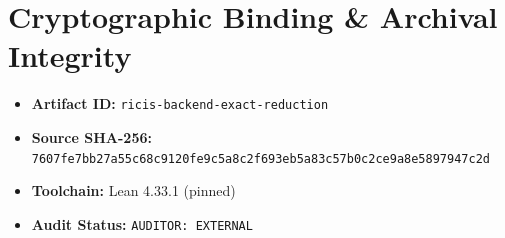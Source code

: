 \documentclass[11pt,a4paper]{article}
\begin{document}
\section{Cryptographic Binding & Archival Integrity}
\begin{itemize}
  \item \textbf{Artifact ID:} \texttt{ricis-backend-exact-reduction}
  \item \textbf{Source SHA-256:} \texttt{7607fe7bb27a55c68c9120fe9c5a8c2f693eb5a83c57b0c2ce9a8e5897947c2d}
  \item \textbf{Toolchain:} Lean 4.33.1 (pinned)
  \item \textbf{Audit Status:} \texttt{AUDITOR: EXTERNAL}
\end{itemize}
\end{document}
